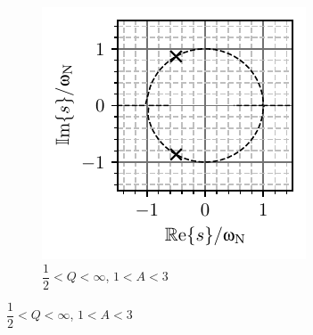 \begin{figure}[b!]
\begin{subfigure}[t]{0.32\textwidth}
        \centering
        \includegraphics{fig/Q_polovi_3.pdf}
        \caption{$\dfrac{1}{2} < Q < \infty$, $1 < A < 3$}
    \end{subfigure}
    

\end{figure}
